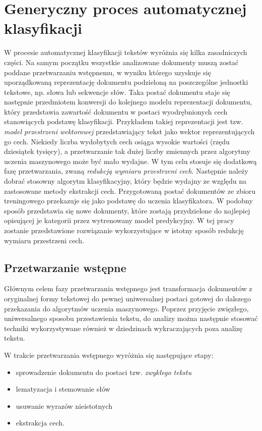 \documentclass{pracamgr}
\begin{document}
\section{Generyczny proces automatycznej klasyfikacji}

W procesie automatycznej klasyfikacji tekstów wyróżnia się kilka zasadniczych części. Na samym początku wszystkie analizowane dokumenty muszą zostać poddane przetwarzaniu wstępnemu, w wyniku którego uzyskuje się uporządkowaną reprezentację dokumentu podzieloną na poszczególne jednostki tekstowe, np. słowa lub sekwencje słów. Taka postać dokumentu staje się następnie przedmiotem konwersji do kolejnego modelu reprezentacji dokumentu, który przedstawia zawartość dokumentu w postaci wyodrębnionych cech stanowiących podstawę klasyfikacji. Przykładem takiej reprezentacji jest tzw. \textit{model przestrzeni wektorowej} przedstawiający tekst jako wektor reprezentujących go cech. Niekiedy liczba wydobytych cech osiąga wysokie wartości (rzędu dziesiątek tysięcy), a przetwarzanie tak dużej liczby zmiennych przez algorytmy uczenia maszynowego może być mało wydajne. W tym celu stosuje się dodatkową fazę przetwarzania, zwaną \textit{redukcją wymiaru przestrzeni cech}. Następnie należy dobrać stosowny algorytm klasyfikacyjny, który będzie wydajny ze względu na zastosowane metody ekstrakcji cech. Przygotowaną postać dokumentów ze zbioru treningowego przekazuje się jako podstawę do uczenia klasyfikatora. W podobny sposób przedstawia się nowe dokumenty, które zostają przydzielone do najlepiej opisującej je kategorii przez wytrenowany model predykcyjny. W tej pracy zostanie przedstawione rozwiązanie wykorzystujące w istotny sposób redukcję wymiaru przestrzeni cech.

\subsection{Przetwarzanie wstępne}

Głównym celem fazy przetwarzania wstępnego jest transformacja dokumentów z oryginalnej formy tekstowej do pewnej uniwersalnej postaci gotowej do dalszego przekazania do algorytmów uczenia maszynowego. Poprzez przyjęcie zwięzłego, uniwersalnego sposobu przestawienia tekstu, do analizy można następnie stosować techniki wykorzystywane również w dziedzinach wykraczających poza analizę tekstu.

W trakcie przetwarzania wstępnego wyróżnia się następujące etapy:
\begin{itemize} %
    \item sprowadzenie dokumentu do postaci tzw. \textit{zwykłego tekstu}
    \item lematyzacja i stemowanie słów
    \item usuwanie wyrazów nieistotnych
    \item ekstrakcja cech.
\end{itemize}
\end{document}
